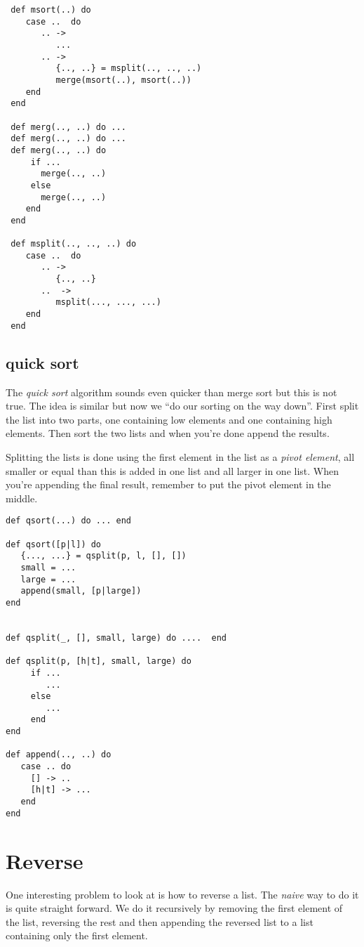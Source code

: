 \documentclass[a4paper,11pt]{article}
\begin{document}
{\begin{verbatim}
 def msort(..) do
    case ..  do
       .. -> 
          ...
       .. ->
          {.., ..} = msplit(.., .., ..)
          merge(msort(..), msort(..))
    end
 end

 def merg(.., ..) do ...
 def merg(.., ..) do ...
 def merg(.., ..) do
     if ... 
       merge(.., ..)
     else 
       merge(.., ..)
    end
 end

 def msplit(.., .., ..) do
    case ..  do
       .. -> 
          {.., ..}
       ..  ->
          msplit(..., ..., ...)
    end
 end
\end{verbatim}

\subsection{quick sort}

The {\em quick sort} algorithm sounds even quicker than merge sort but
this is not true. The idea is similar but now we ``do our sorting on
the way down''. First split the list into two parts, one containing low
elements and one containing high elements. Then sort the two lists and
when you're done append the results. 

Splitting the lists is done using the first element in the list as a
{\em pivot element}, all smaller or equal than this is added in one
list and all larger in one list. When you're appending the final
result, remember to put the pivot element in the middle.

\begin{verbatim}
def qsort(...) do ... end

def qsort([p|l]) do 
   {..., ...} = qsplit(p, l, [], [])
   small = ...
   large = ...
   append(small, [p|large])
end


def qsplit(_, [], small, large) do ....  end

def qsplit(p, [h|t], small, large) do
     if ... 
        ...
     else
        ...
     end
end

def append(.., ..) do
   case .. do
     [] -> ..
     [h|t] -> ...
   end
end

\end{verbatim}

\section{Reverse}

One interesting problem to look at is how to reverse a list. The {\em
  naive} way to do it is quite straight forward. We do it recursively
by removing the first element of the list, reversing the rest and then
appending the reversed list to a list containing only the first element.

}
\end{document}
